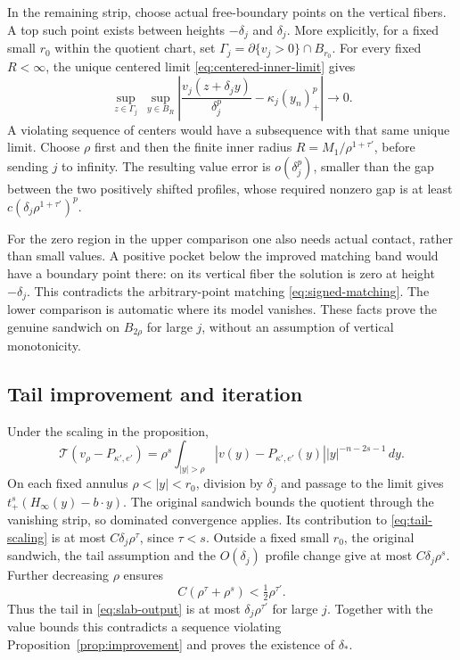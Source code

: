 \documentclass[11pt]{article}
\numberwithin{equation}{section}
\newcommand{\T}{\mathcal T}
\begin{document}
In the remaining strip, choose actual free-boundary points on the vertical
fibers. A top such point exists between heights $-\delta_j$ and
$\delta_j$. More explicitly, for a fixed small $r_0$ within the quotient
chart, set $\Gamma_j=\partial\{v_j>0\}\cap B_{r_0}$. For every fixed
$R<\infty$, the unique centered limit \eqref{eq:centered-inner-limit} gives
\[
 \sup_{z\in\Gamma_j}\ \sup_{y\in B_R}
 \left|\frac{v_j(z+\delta_j y)}{\delta_j^p}
                         -\kappa_j(y_n)_+^p\right|\longrightarrow0.
\]
A violating sequence of centers would have a subsequence with that same
unique limit. Choose $\rho$ first and then the finite inner radius
$R=M_1/\rho^{1+\tau'}$, before sending $j$ to infinity. The resulting
value error is $o(\delta_j^p)$,
smaller than the gap between the two positively shifted profiles, whose
required nonzero gap is at least
$c(\delta_j\rho^{1+\tau'})^p$.

For the zero region in the upper comparison one also needs actual contact,
rather than small values. A positive pocket below the improved matching
band would have a boundary point there: on its vertical fiber the solution
is zero at height $-\delta_j$. This contradicts the arbitrary-point
matching \eqref{eq:signed-matching}. The lower comparison is automatic
where its model vanishes. These facts prove the genuine sandwich on
$B_{2\rho}$ for large $j$, without an assumption of vertical monotonicity.

\subsection{Tail improvement and iteration}

Under the scaling in the proposition,
\begin{equation}\label{eq:tail-scaling}
 \T(v_\rho-P_{\kappa',e'})=
       \rho^s\int_{|y|>\rho}|v(y)-P_{\kappa',e'}(y)|
                                      |y|^{-n-2s-1}\,dy.
\end{equation}
On each fixed annulus $\rho<|y|<r_0$, division by $\delta_j$ and passage
to the limit gives
$t_+^s(H_\infty(y)-b\cdot y)$. The original sandwich bounds the quotient
through the vanishing strip, so dominated convergence applies. Its
contribution to \eqref{eq:tail-scaling} is at most
$C\delta_j\rho^\tau$, since $\tau<s$. Outside a fixed small $r_0$, the
original sandwich, the tail assumption and the $O(\delta_j)$ profile change
give at most $C\delta_j\rho^s$. Further decreasing $\rho$ ensures
\[
                       C(\rho^\tau+\rho^s)<\tfrac12\rho^{\tau'}.
\]
Thus the tail in \eqref{eq:slab-output} is at most
$\delta_j\rho^{\tau'}$ for large $j$. Together with the value bounds this
contradicts a sequence violating Proposition~\ref{prop:improvement} and
proves the existence of $\delta_*$.
\end{document}
